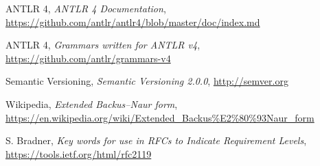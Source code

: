 \documentclass[11pt,a4paper]{report}
\begin{document}
\clearpage

\begin{thebibliography}{100}

    ANTLR 4,
    \textit{ANTLR 4 Documentation},
    \url{https://github.com/antlr/antlr4/blob/master/doc/index.md}

    ANTLR 4,
    \textit{Grammars written for ANTLR v4},
    \url{https://github.com/antlr/grammars-v4}

    Semantic Versioning,
    \textit{Semantic Versioning 2.0.0},
    \url{http://semver.org}

    Wikipedia,
    \textit{Extended Backus–Naur form},
    \url{https://en.wikipedia.org/wiki/Extended_Backus\%E2\%80\%93Naur_form}

    S. Bradner,
    \textit{Key words for use in RFCs to Indicate Requirement Levels},
    \url{https://tools.ietf.org/html/rfc2119}

\end{thebibliography}
\end{document}
